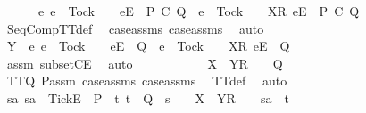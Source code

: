 \begin{isabellebody}
\ \ \ \ \ \ {\isacharbraceleft}e{\isachardot}\ e\ {\isasymnoteq}\ Tock\ {\isasymand}\ {\isasymrho}\ {\isacharat}\ {\isacharbrackleft}{\isacharbrackleft}e{\isacharbrackright}\isactrlsub E{\isacharbrackright}\ {\isasymin}\ P\ {\isacharsemicolon}\isactrlsub C\ Q\ {\isasymor}\ e\ {\isacharequal}\ Tock\ {\isasymand}\ {\isasymrho}\ {\isacharat}\ {\isacharbrackleft}{\isacharbrackleft}X{\isacharbrackright}\isactrlsub R{\isacharcomma}\ {\isacharbrackleft}e{\isacharbrackright}\isactrlsub E{\isacharbrackright}\ {\isasymin}\ P\ {\isacharsemicolon}\isactrlsub C\ Q{\isacharbraceright}{\isachardoublequoteclose}\isanewline
\ \ \ \ \ \ \ \ \isamarkupfalse%
\ SeqCompTT{\isacharunderscore}def\ \isamarkupfalse%
\ case{\isacharunderscore}assms\ case{\isacharunderscore}assms{}\ \isamarkupfalse%
\ auto\isanewline
\ \ \ \ \ \ \isamarkupfalse%
\ \isamarkupfalse%
\ {\isachardoublequoteopen}Y\ {\isasyminter}\ {\isacharbraceleft}e{\isachardot}\ e\ {\isasymnoteq}\ Tock\ {\isasymand}\ {\isasymrho}{\isacharprime}\ {\isacharat}\ {\isacharbrackleft}{\isacharbrackleft}e{\isacharbrackright}\isactrlsub E{\isacharbrackright}\ {\isasymin}\ Q\ {\isasymor}\ e\ {\isacharequal}\ Tock\ {\isasymand}\ {\isasymrho}{\isacharprime}\ {\isacharat}\ {\isacharbrackleft}{\isacharbrackleft}X{\isacharbrackright}\isactrlsub R{\isacharcomma}\ {\isacharbrackleft}e{\isacharbrackright}\isactrlsub E{\isacharbrackright}\ {\isasymin}\ Q{\isacharbraceright}\ {\isacharequal}\ {\isacharbraceleft}{\isacharbraceright}{\isachardoublequoteclose}\isanewline
\ \ \ \ \ \ \ \ \isamarkupfalse%
\ assm{}\ subsetCE\ \isamarkupfalse%
\ auto\isanewline
\ \ \ \ \ \ \isamarkupfalse%
\ \isamarkupfalse%
\ {\isachardoublequoteopen}{\isasymrho}{\isacharprime}\ {\isacharat}\ {\isacharbrackleft}X\ {\isasymunion}\ Y{\isacharbrackright}\isactrlsub R\ {\isacharhash}\ {\isasymsigma}\ {\isasymin}\ Q{\isachardoublequoteclose}\isanewline
\ \ \ \ \ \ \ \ \isamarkupfalse%
\ TT{}{\isacharunderscore}Q\ P{\isacharunderscore}assm{}\ case{\isacharunderscore}assms\ case{\isacharunderscore}assms{}\ \isamarkupfalse%
\ TT{}{\isacharunderscore}def\ \isamarkupfalse%
\ auto\isanewline
\ \ \ \ \ \ \isamarkupfalse%
\ \isamarkupfalse%
\ {\isachardoublequoteopen}{\isasymforall}sa{\isachardot}\ sa\ {\isacharat}\ {\isacharbrackleft}{\isacharbrackleft}Tick{\isacharbrackright}\isactrlsub E{\isacharbrackright}\ {\isasymin}\ P\ {\isasymlongrightarrow}\ {\isacharparenleft}{\isasymforall}t{\isachardot}\ t\ {\isasymin}\ Q\ {\isasymlongrightarrow}\ s\ {\isacharat}\ {\isasymrho}{\isacharprime}\ {\isacharat}\ {\isacharbrackleft}X\ {\isasymunion}\ Y{\isacharbrackright}\isactrlsub R\ {\isacharhash}\ {\isasymsigma}\ {\isasymnoteq}\ sa\ {\isacharat}\ t{\isacharparenright}\ {\isasymLongrightarrow}\isanewline

\end{isabellebody}

